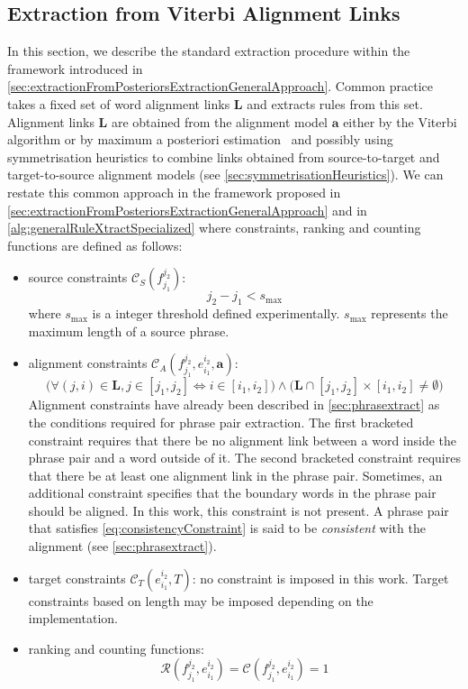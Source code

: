 \subsection{Extraction from Viterbi Alignment Links}
\label{sec:extractionFromPosteriorsViterbi}

In this section, we describe the standard extraction procedure within
the framework introduced in
\autoref{sec:extractionFromPosteriorsExtractionGeneralApproach}.
Common practice takes a fixed set of word alignment links $\bm{L}$
and extracts
rules from this set. Alignment links $\bm{L}$ are obtained from
the alignment model $\bm{a}$ either by the Viterbi algorithm or
by maximum a posteriori
estimation~\citep{matusov-zens-ney:2004:COLING,kumar-och-macherey:2007:EMNLP}
and possibly using symmetrisation heuristics to combine links obtained
from source-to-target and target-to-source alignment
models (see \autoref{sec:symmetrisationHeuristics}). We can restate this
common approach in the framework proposed in
\autoref{sec:extractionFromPosteriorsExtractionGeneralApproach} and in
\autoref{alg:generalRuleXtractSpecialized} where constraints, ranking and
counting functions are defined as follows:
%
\begin{itemize}
  \item source constraints $\mathcal{C}_S(f_{j_1}^{j_2})$:
%
\begin{equation}
  j_2 - j_1 < s_{\text{max}}
\end{equation}
%
where $s_{\text{max}}$ is a integer threshold defined experimentally.
$s_{\text{max}}$ represents the maximum length of a source phrase.
  \item alignment constraints $\mathcal{C}_A(f_{j_1}^{j_2}, e_{i_1}^{i_2}, \bm{a})$:
%
\begin{equation}
  \Big( \forall (j,i) \in \bm{L}, j \in [j_1, j_2] \Leftrightarrow i \in [i_1,i_2] \Big) \land \Big( \bm{L} \cap [j_1, j_2] \times [i_1, i_2] \neq \emptyset \Big)
  \label{eq:consistencyConstraint}
\end{equation}
%
Alignment constraints have already been described in \autoref{sec:phrasextract} as
the conditions required for phrase pair extraction.
The first bracketed constraint requires that there be no alignment link between a
word inside the phrase pair and a word outside of it. The second
bracketed constraint
requires that
there be at least one alignment link in the phrase pair. Sometimes, an
additional constraint specifies that the boundary words in the phrase pair
should be aligned. In this work, this constraint is not present. %
A phrase pair that satisfies \autoref{eq:consistencyConstraint} is said
to be \emph{consistent} with the alignment (see \autoref{sec:phrasextract}).
  \item target constraints $\mathcal{C}_T(e_{i_1}^{i_2}, T)$: no constraint is
    imposed in this work. Target constraints based on length may be imposed
    depending on the implementation.
  \item ranking and counting functions:
%
\begin{equation}
  \mathcal{R}(f_{j_1}^{j_2},e_{i_1}^{i_2}) = \mathcal{C}(f_{j_1}^{j_2},e_{i_1}^{i_2}) = 1
\end{equation}
\end{itemize}
